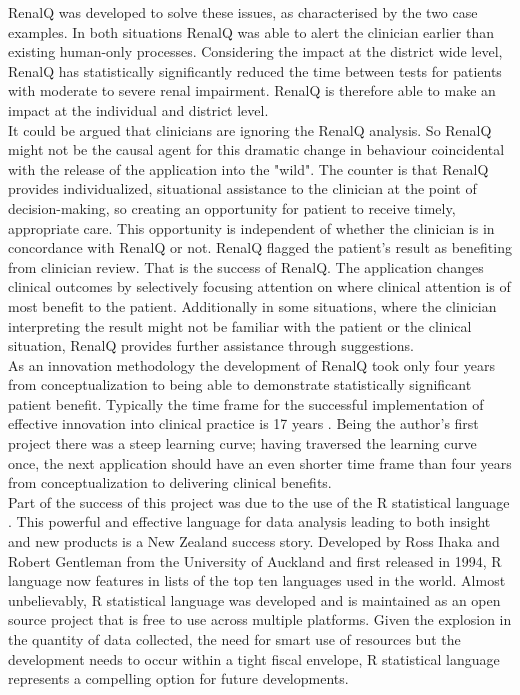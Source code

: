 ﻿\documentclass[11pt]{article}
\begin{document}
RenalQ was developed to solve these issues, as characterised by the two case examples. In both situations RenalQ was able to alert the clinician earlier than existing human-only processes. Considering the impact at the district wide level, RenalQ has statistically significantly reduced the time between tests for patients with moderate to severe renal impairment. RenalQ is therefore able to make an impact at the individual and district level. \\

It could be argued that clinicians are ignoring the RenalQ analysis. So RenalQ might not be the causal agent for this dramatic change in behaviour coincidental with the release of the application into the "wild". The counter is that RenalQ provides individualized, situational assistance to the clinician at the point of decision-making, so creating an opportunity for patient to receive timely, appropriate care. This opportunity is independent of whether the clinician is in concordance with RenalQ or not. RenalQ flagged the patient's result as benefiting from clinician review. That is the success of RenalQ.  The application changes clinical outcomes by selectively focusing attention on where clinical attention is of most benefit to the patient.  Additionally in some situations, where the clinician interpreting the result might not be familiar with the patient or the clinical situation, RenalQ provides further assistance through suggestions. \\ 

As an innovation methodology the development of RenalQ took only four years from conceptualization to being able to demonstrate statistically significant patient benefit. Typically the time frame for the successful implementation of effective innovation into clinical practice is 17 years \citep{morris2011answer}. Being the author's first project there was a steep learning curve; having traversed the learning curve once, the next application should have an even shorter time frame than four years from conceptualization to delivering clinical benefits. \\

Part of the success of this project was due to the use of the R statistical language \citep{rstat2013}. This powerful and effective language for data analysis leading to both insight and new products is a New Zealand success story. Developed by Ross Ihaka and Robert Gentleman from the University of Auckland and first released in 1994, R language now features in lists of the top ten languages used in the world. Almost unbelievably, R statistical language was developed and is maintained as an open source project that is free to use across multiple platforms. Given the explosion in the quantity of data collected, the need for smart use of resources but the development needs to occur within a tight fiscal envelope, R statistical language represents a compelling option for future developments. \\
\end{document}
